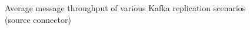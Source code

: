 \begin{figure}[htbp]
{    }
    \hfill
    \centering
    \hfill
    \caption{Average message throughput of various Kafka replication scenarios (source connector)}
    \label{fig:appendix02:results:sourcemessages}
\end{figure}

